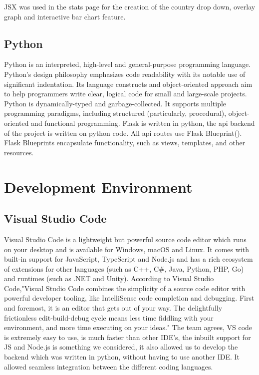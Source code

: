 JSX was used in the stats page for the creation of the country drop down, overlay graph and interactive bar chart feature. 
\subsection{Python}
Python is an interpreted, high-level and general-purpose programming language. Python's design philosophy emphasizes code readability with its notable use of significant indentation. Its language constructs and object-oriented approach aim to help programmers write clear, logical code for small and large-scale projects.
Python is dynamically-typed and garbage-collected. It supports multiple programming paradigms, including structured (particularly, procedural), object-oriented and functional programming.\cite{python}
Flask is written in python, the api backend of the project is written on python code. All api routes use Flask Blueprint().
Flask Blueprints encapsulate functionality, such as views, templates, and other resources.

\section{Development Environment}
\subsection{Visual Studio Code}
Visual Studio Code is a lightweight but powerful source code editor which runs on your desktop and is available for Windows, macOS and Linux. It comes with built-in support for JavaScript, TypeScript and Node.js and has a rich ecosystem of extensions for other languages (such as C++, C\#, Java, Python, PHP, Go) and runtimes (such as .NET and Unity).\cite{vscode}
According to Visual Studio Code,"Visual Studio Code combines the simplicity of a source code editor with powerful developer tooling, like IntelliSense code completion and debugging.
First and foremost, it is an editor that gets out of your way. The delightfully frictionless edit-build-debug cycle means less time fiddling with your environment, and more time executing on your ideas."\cite{whyvscode}
\vspace{5mm}
The team agrees, VS code is extremely easy to use, is much faster than other IDE's, the inbuilt support for JS and Node.js is something we considered, it also allowed us to develop the backend which was written in python, without having to use another IDE. It allowed seamless integration between the different coding languages.


